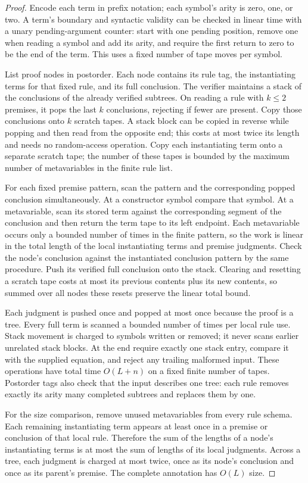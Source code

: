 \documentclass[11pt]{article}
\theoremstyle{definition}
\theoremstyle{remark}
\begin{document}
\begin{proof}
Encode each term in prefix notation; each symbol's arity is zero,
one, or two. A term's boundary and syntactic validity can be checked
in linear time with a unary pending-argument counter: start with
one pending position, remove one when reading a symbol and add its
arity, and require the first return to zero to be the end of the
term. This uses a fixed number of tape moves per symbol.

List proof nodes in postorder. Each node contains its rule tag,
the instantiating terms for that fixed rule, and its full conclusion.
The verifier maintains a stack of the conclusions of the already
verified subtrees. On reading a rule with $k\le2$ premises, it pops
the last $k$ conclusions, rejecting if fewer are present. Copy those
conclusions onto $k$ scratch tapes. A stack block can be copied in
reverse while popping and then read from the opposite end; this
costs at most twice its length and needs no random-access operation.
Copy each instantiating term onto
a separate scratch tape; the number of these tapes is bounded by
the maximum number of metavariables in the finite rule list.

For each fixed premise pattern, scan the pattern and the corresponding
popped conclusion simultaneously. At a constructor symbol compare
that symbol. At a metavariable, scan its stored term against the
corresponding segment of the conclusion and then return the term
tape to its left endpoint. Each metavariable occurs only a bounded
number of times in the finite pattern, so the work is linear in the
total length of the local instantiating terms and premise judgments.
Check the node's conclusion against the instantiated conclusion
pattern by the same procedure. Push its verified full conclusion
onto the stack. Clearing and resetting a scratch tape costs at most
its previous contents plus its new contents, so summed over all
nodes these resets preserve the linear total bound.

Each judgment is pushed once and popped at most once because the
proof is a tree. Every full term is scanned a bounded number of
times per local rule use. Stack movement is charged to symbols
written or removed; it never scans earlier unrelated stack blocks.
At the end require exactly one stack entry, compare it with the
supplied equation, and reject any trailing malformed input.
These operations have total time $O(L+n)$ on a fixed finite number
of tapes. Postorder tags also check that the input describes one
tree: each rule removes exactly its arity many completed subtrees
and replaces them by one.

For the size comparison, remove unused metavariables from every
rule schema. Each remaining instantiating term appears at least
once in a premise or conclusion of that local rule. Therefore the
sum of the lengths of a node's instantiating terms is at most the
sum of lengths of its local judgments. Across a tree, each judgment
is charged at most twice, once as its node's conclusion and once
as its parent's premise. The complete annotation has $O(L)$ size.
\end{proof}
\end{document}
